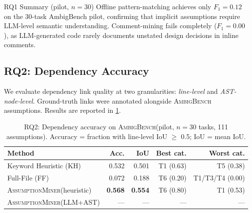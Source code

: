\documentclass[sigconf,review,anonymous]{acmart}
\newcommand{\sysname}{\textsc{AssumptionMiner}\xspace}
\newcommand{\benchname}{\textsc{AmbigBench}\xspace}
\begin{document}
\begin{rqbox}{RQ1 Summary (pilot, $n=30$)}
Offline pattern-matching achieves only $F_1=0.12$ on the 30-task AmbigBench
pilot, confirming that implicit assumptions require LLM-level semantic
understanding. Comment-mining fails completely ($F_1=0.00$), as LLM-generated
code rarely documents unstated design decisions in inline comments.
\end{rqbox}

\subsection{RQ2: Dependency Accuracy}
\label{sec:rq2}

We evaluate dependency link quality at two granularities: \emph{line-level} and
\emph{AST-node-level}.  Ground-truth links were annotated alongside \benchname
assumptions.  Results are reported in \cref{tab:rq2}.

\begin{table}[t]
\caption{RQ2: Dependency accuracy on \benchname (pilot, $n=30$ tasks, 111 assumptions).
         Accuracy = fraction with line-level IoU $\geq$ 0.5; IoU = mean IoU.}
\label{tab:rq2}
\small
\begin{tabular}{@{}lrrrr@{}}
\toprule
\textbf{Method} & \textbf{Acc.} & \textbf{IoU} & \textbf{Best cat.} & \textbf{Worst cat.} \\
\midrule
Keyword Heuristic (KH)  & 0.532 & 0.501 & T1 (0.63) & T5 (0.38) \\
Full-File (FF)          & 0.072 & 0.188 & T6 (0.20) & T1/T3/T4 (0.00) \\
\sysname (heuristic)   & \textbf{0.568} & \textbf{0.554} & T6 (0.80) & T1 (0.53) \\
\sysname (LLM+AST)      & — & — & — & — \\
\bottomrule
\end{tabular}
\end{table}
\end{document}
